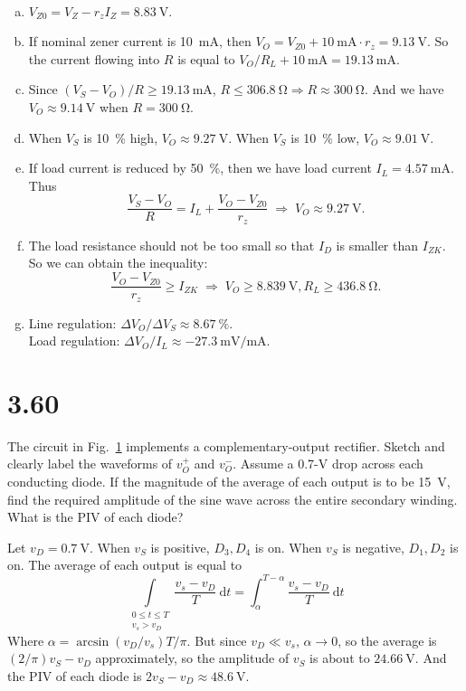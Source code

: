 \documentclass[12pt, a4paper]{article}
\newcommand{\iD}{\:\mathrm{d}}
\theoremstyle{mystyle}	%
\newcommand{\Ans}{\noindent{\bf Ans:}}
\begin{document}
\Ans \\
\begin{enumerate}[(a)]
  \item $V_{Z0} = V_Z - r_z I_Z = \SI{8.83}{\V}$.
  \item If nominal zener current is \SI{10}{\mA}, then $V_O = V_{Z0} + \SI{10}{\mA} \cdot r_z = \SI{9.13}{\V}$.
So the current flowing into $R$ is equal to $V_O/R_L + \SI{10}{\mA} =
\SI{19.13}{\mA}$.
  \item Since $(V_S - V_O)/R \ge \SI{19.13}{\mA}$,
$R \le \SI{306.8}{\ohm} \Rightarrow R \approx \SI{300}{\ohm}$. And we have
$V_O \approx \SI{9.14}{\V}$ when $R = \SI{300}{\ohm}$. 
  \item When $V_S$ is \SI{10}{\percent} high, $V_O \approx \SI{9.27}{\V}$. When $V_S$ is \SI{10}{\percent} low, $V_O \approx \SI{9.01}{\V}$.
  \item If load current is reduced by \SI{50}{\percent}, then we have load current
$I_L = \SI{4.57}{\mA}$. Thus
\[ \frac{V_S - V_O}{R} = I_L + \frac{V_O - V_{Z0}}{r_z}
  \; \Rightarrow \; V_O \approx \SI{9.27}{\V}. \]
  \item The load resistance should not be too small so that $I_D$ is smaller than
$I_{ZK}$. So we can obtain the inequality:
\[ \frac{V_O - V_{Z0}}{r_z} \ge I_{ZK} \; \Rightarrow \;
V_O \ge \SI{8.839}{\V}, R_L \ge \SI{436.8}{\ohm}. \]
\item Line regulation: $\Delta V_O/ \Delta V_S \approx \SI{8.67}{\percent}$. \\
Load regulation: $\Delta V_O/I_L \approx \SI{-27.3}{\mV/\mA}$.
\end{enumerate}

\section{3.60}
The circuit in Fig.~\ref{fig:3.60} implements a complementary-output
rectifier. Sketch and clearly label the waveforms of $v_O^+$ and $v_O^-$.
Assume a 0.7-\si{\V} drop across each conducting diode. If the
magnitude of the average of each output is to be \SI{15}{\V}, find
the required amplitude of the sine wave across the entire secondary
winding. What is the PIV of each diode?

\begin{figure}[H]
  
  \caption{}
  \label{fig:3.60}
\end{figure}

Let $v_D = \SI{0.7}\V$. When $v_S$ is positive, $D_3, D_4$ is on. When $v_S$ is negative, 
$D_1, D_2$ is on. The average of each output is equal to
\[
  \int\limits_{\substack{0 \leq t \leq T \\ v_s > v_D}} \frac{v_s - v_D}{T} \iD t = \int_{\alpha}^{T-\alpha} \frac{v_s - v_D}{T} \iD t
\]
Where $\alpha = \arcsin(v_D/v_s) T / \pi$. But since $v_D \ll v_s$, $\alpha \rightarrow 0$, so the average is $(2/\pi) v_S - v_D$ approximately, so the amplitude of $v_S$ is about to
$\SI{24.66}{\V}$.
And the PIV of each diode is $2v_S - v_D \approx \SI{48.6}{\V}$.

% 
\end{document}
